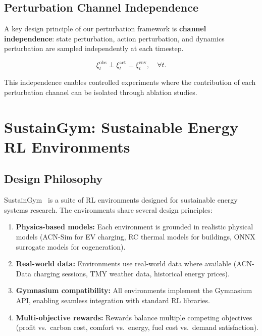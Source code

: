 \subsection{Perturbation Channel Independence}

A key design principle of our perturbation framework is \textbf{channel independence}: state perturbation, action perturbation, and dynamics perturbation are sampled independently at each timestep.

\begin{assumption}
\label{ass:independence}
\begin{equation}
    \xi_t^{\text{obs}} \perp \xi_t^{\text{act}} \perp \xi_t^{\text{env}}, \quad \forall t.
\end{equation}
\end{assumption}

This independence enables controlled experiments where the contribution of each perturbation channel can be isolated through ablation studies.

\section{SustainGym: Sustainable Energy RL Environments}
\label{sec:sustaingym}

\subsection{Design Philosophy}

SustainGym~\citep{yeh2023sustaingym} is a suite of RL environments designed for sustainable energy systems research. The environments share several design principles:

\begin{enumerate}
    \item \textbf{Physics-based models:} Each environment is grounded in realistic physical models (ACN-Sim for EV charging, RC thermal models for buildings, ONNX surrogate models for cogeneration).
    \item \textbf{Real-world data:} Environments use real-world data where available (ACN-Data charging sessions, TMY weather data, historical energy prices).
    \item \textbf{Gymnasium compatibility:} All environments implement the Gymnasium API, enabling seamless integration with standard RL libraries.
    \item \textbf{Multi-objective rewards:} Rewards balance multiple competing objectives (profit vs.\ carbon cost, comfort vs.\ energy, fuel cost vs.\ demand satisfaction).
\end{enumerate}

